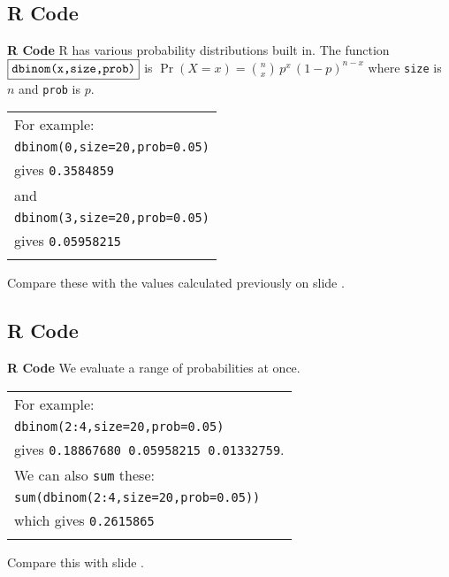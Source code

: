 \documentclass[compress]{beamer}        %
\makeatletter
\newcommand{\tcb}{\textcolor{beamer@blendedblue}}
\makeatother
\begin{document}
\subsection{R Code}
\begin{frame}{\bf \tcb{R Code}}
R has various probability distributions built in. The function $\boxed{\text{\texttt{dbinom(x,size,prob)}}}$ is $\Pr(X=x) = \binom{n}{x}\,p^x\,(1-p)^{n-x}$ where \texttt{size} is $n$ and \texttt{prob} is $p$.\\[0.4cm]
\begin{tabular}{|l|}
\hline
For example: \\[0.2cm]
\texttt{dbinom(0,size=20,prob=0.05)} \\
gives \texttt{0.3584859}\\[0.2cm]
and\\[0.2cm]
\texttt{dbinom(3,size=20,prob=0.05)} \\
gives \texttt{0.05958215}\\
\hline
\multicolumn{1}{c}{}\\[0.1cm]
\end{tabular}

Compare these with the values calculated previously on slide \pageref{binexample}.
\end{frame}


\subsection{R Code}
\begin{frame}{\bf \tcb{R Code}}
We evaluate a range of probabilities at once.\\[0.4cm]
\begin{tabular}{|l|}
\hline
For example:\\[0.2cm]
\texttt{dbinom(2:4,size=20,prob=0.05)} \\
gives \texttt{0.18867680 0.05958215 0.01332759}.\\[0.4cm]
We can also \texttt{sum} these:\\[0.1cm]
\texttt{sum(dbinom(2:4,size=20,prob=0.05))} \\
which gives \texttt{0.2615865}\\
\hline
\multicolumn{1}{c}{}\\[0.1cm]
\end{tabular}

Compare this with slide \pageref{binexampleran}.
\end{frame}
\end{document}
